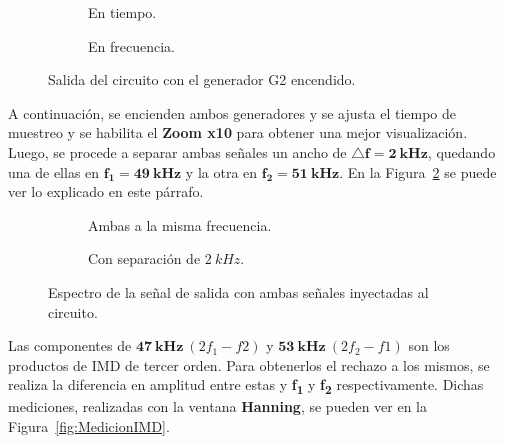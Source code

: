     \begin{figure}[H]
      \centering
      \begin{subfigure}[H]{0.44\textwidth}
        \caption{En tiempo.}
      \end{subfigure}
      \hfill 
      \begin{subfigure}[H]{0.43\textwidth}
        \caption{En frecuencia.}
      \end{subfigure}

      \caption{Salida del circuito con el generador G2 encendido.}
      \label{fig:SalidaCircuitConG2Encendido}
    \end{figure}

    A continuación, se encienden ambos generadores y se ajusta el tiempo de muestreo y se habilita el \textbf{Zoom x10}
    para obtener una mejor visualización. Luego, se procede a separar ambas señales un ancho de $\mathbf{\triangle f=  2~kHz}$,
    quedando una de ellas en $\mathbf{f_1=49~kHz}$ y la otra en $\mathbf{f_2=51~kHz}$. En la
    Figura~\ref{fig:SalidaConAmbosGeneradores} se puede ver lo explicado en este párrafo.

    \begin{figure}[H]
      \centering
      \begin{subfigure}[H]{0.48\textwidth}
        \caption{Ambas a la misma frecuencia.}
      \end{subfigure}
      \hfill 
      \begin{subfigure}[H]{0.48\textwidth}
        \caption{Con separación de $2~kHz$.}
      \end{subfigure}

      \caption{Espectro de la señal de salida con ambas señales inyectadas al circuito.}
      \label{fig:SalidaConAmbosGeneradores}
    \end{figure}

    Las componentes de $\mathbf{47~kHz}\  (2f_1 - f2)$ y $\mathbf{53~kHz}\  (2f_2 - f1)$ son los productos de IMD de 
    tercer orden. Para obtenerlos el rechazo a los mismos, se realiza la diferencia en amplitud entre estas y 
    \textbf{f\textsubscript{1}} y \textbf{f\textsubscript{2}} respectivamente. Dichas mediciones,
    realizadas con la ventana \textbf{Hanning}, se pueden ver en la Figura~\ref{fig:MedicionIMD}.

